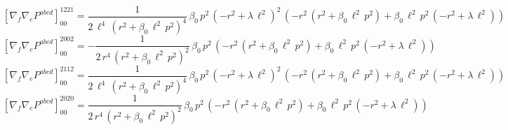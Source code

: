 \documentclass[11pt]{article}
\begin{document}
\begin{dmath*}[breakdepth={5}]
\left[\nabla_f\nabla_e P^{abcd}\right]_{00}^{1221} = \frac{1}{2\,{\ell}^{4}\,{\left({r}^{2} + \beta_{0}\,{\ell}^{2}\,{p}^{2}\right)}^{4}}\,\beta_{0}\,{p}^{2}\,{\left(-{r}^{2} + \lambda\,{\ell}^{2}\right)}^{2}\,\left(-{r}^{2}\,\left({r}^{2} + \beta_{0}\,{\ell}^{2}\,{p}^{2}\right) + \beta_{0}\,{\ell}^{2}\,{p}^{2}\,\left(-{r}^{2} + \lambda\,{\ell}^{2}\right)\right)
\end{dmath*}
\begin{dmath*}[breakdepth={5}]
\left[\nabla_f\nabla_e P^{abcd}\right]_{00}^{2002} = -\frac{1}{2\,{r}^{4}\,{\left({r}^{2} + \beta_{0}\,{\ell}^{2}\,{p}^{2}\right)}^{2}}\,\beta_{0}\,{p}^{2}\,\left(-{r}^{2}\,\left({r}^{2} + \beta_{0}\,{\ell}^{2}\,{p}^{2}\right) + \beta_{0}\,{\ell}^{2}\,{p}^{2}\,\left(-{r}^{2} + \lambda\,{\ell}^{2}\right)\right)
\end{dmath*}
\begin{dmath*}[breakdepth={5}]
\left[\nabla_f\nabla_e P^{abcd}\right]_{00}^{2112} = \frac{1}{2\,{\ell}^{4}\,{\left({r}^{2} + \beta_{0}\,{\ell}^{2}\,{p}^{2}\right)}^{4}}\,\beta_{0}\,{p}^{2}\,{\left(-{r}^{2} + \lambda\,{\ell}^{2}\right)}^{2}\,\left(-{r}^{2}\,\left({r}^{2} + \beta_{0}\,{\ell}^{2}\,{p}^{2}\right) + \beta_{0}\,{\ell}^{2}\,{p}^{2}\,\left(-{r}^{2} + \lambda\,{\ell}^{2}\right)\right)
\end{dmath*}
\begin{dmath*}[breakdepth={5}]
\left[\nabla_f\nabla_e P^{abcd}\right]_{00}^{2020} = \frac{1}{2\,{r}^{4}\,{\left({r}^{2} + \beta_{0}\,{\ell}^{2}\,{p}^{2}\right)}^{2}}\,\beta_{0}\,{p}^{2}\,\left(-{r}^{2}\,\left({r}^{2} + \beta_{0}\,{\ell}^{2}\,{p}^{2}\right) + \beta_{0}\,{\ell}^{2}\,{p}^{2}\,\left(-{r}^{2} + \lambda\,{\ell}^{2}\right)\right)
\end{dmath*}
\end{document}
